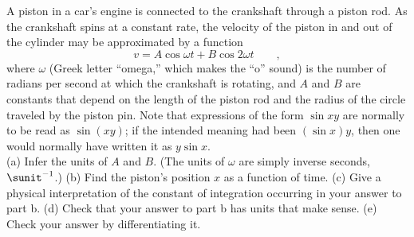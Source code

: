A piston in a car's engine is connected to the crankshaft through a
piston rod. As the crankshaft spins at a constant rate, the velocity
of the piston in and out of the cylinder may be approximated by
a function
\begin{equation*}
  v = A\cos\omega t+B\cos 2\omega t \qquad ,
\end{equation*}
where $\omega$ (Greek letter ``omega,'' which makes the ``o'' sound)
is the number of radians per second at which the crankshaft is rotating,
and $A$ and $B$ are constants that depend on the length of the piston
rod and the radius of the circle traveled by the piston pin. Note that expressions
of the form $\sin xy$ are normally to be read as $\sin(xy)$; if the intended meaning
had been $(\sin x)y$, then one would normally have written it as $y\sin x$.\\
(a) Infer the units of $A$ and $B$. (The units of $\omega$ are simply inverse
seconds, $\sunit^{-1}$.)\hwendpart
(b) Find the piston's position $x$ as a function of time.\answercheck\hwendpart
(c) Give a physical interpretation of the constant of integration occurring in
your answer to part b.\hwendpart
(d) Check that your answer to part b has units that make sense.\hwendpart
(e) Check your answer by differentiating it.
